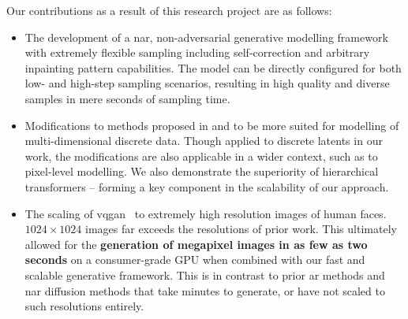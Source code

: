 Our contributions as a result of this research project are as follows:
\begin{itemize}
    \item
        The development of a \acrlong{nar}, non-adversarial generative modelling
        framework with extremely flexible sampling including self-correction and
        arbitrary inpainting pattern capabilities. The model can be directly
        configured for both low- and high-step sampling scenarios, resulting in
        high quality and diverse samples in mere seconds of sampling time.

    \item
        Modifications to methods proposed in \citet{savinov2022stepunrolled} and
        \citet{nawrot2021hierarchical} to be more suited for modelling of
        multi-dimensional discrete data. Though applied to discrete latents in
        our work, the modifications are also applicable in a wider context,
        such as to pixel-level modelling. We also demonstrate the superiority of
        hierarchical transformers -- forming a key component in the scalability
        of our approach. 

    \item
        The scaling of \gls{vqgan}~\cite{esser2021taming} to extremely high
        resolution images of human faces. $1024 \times 1024$ images far exceeds
        the resolutions of prior work. This ultimately allowed for the
        \textbf{generation of megapixel images in as few as two seconds} on a
        consumer-grade GPU when combined with our fast and scalable generative
        framework. This is in contrast to prior \gls{ar} methods and \gls{nar}
        diffusion methods that take minutes to generate, or have not scaled to
        such resolutions entirely.

\end{itemize}
